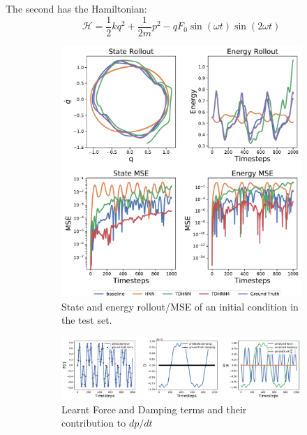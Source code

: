 \documentclass[twoside]{article}
\begin{document}
The second has the Hamiltonian:
\begin{equation}
\mathcal{H} = \frac{1}{2}kq^2 + \frac{1}{2m}p^2 - qF_0\sin(\omega t)\sin(2\omega t)
\end{equation}
\begin{figure}[h!]
\centering
\captionsetup{justification=centering}
	\begin{subfigure}[b]{0.4\textwidth}
		\centering
		\includegraphics[width=\textwidth]{figures/forced_mass_spring_2.pdf}
		\caption{State and energy rollout/MSE of an initial condition in the test set.}
	\end{subfigure}
	\begin{subfigure}[b]{0.48\textwidth}
		\centering
		\includegraphics[width=\textwidth]{figures/dpdt_forced_mass_spring_2.pdf}
		\caption{Learnt Force and Damping terms and their contribution to $dp/dt$}
	\end{subfigure}
	\begin{subfigure}[b]{0.48\textwidth}

\end{subfigure}
\end{figure}
\end{document}
